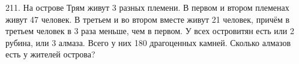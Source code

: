 211. На острове Трям живут 3 разных племени. В первом и втором племенах живут 47 человек. В третьем и во втором вместе живут 21 человек, причём в третьем человек в 3 раза меньше, чем в первом. У всех островитян есть или 2 рубина, или 3 алмаза. Всего у них 180 драгоценных камней. Сколько алмазов есть у жителей острова?\\
